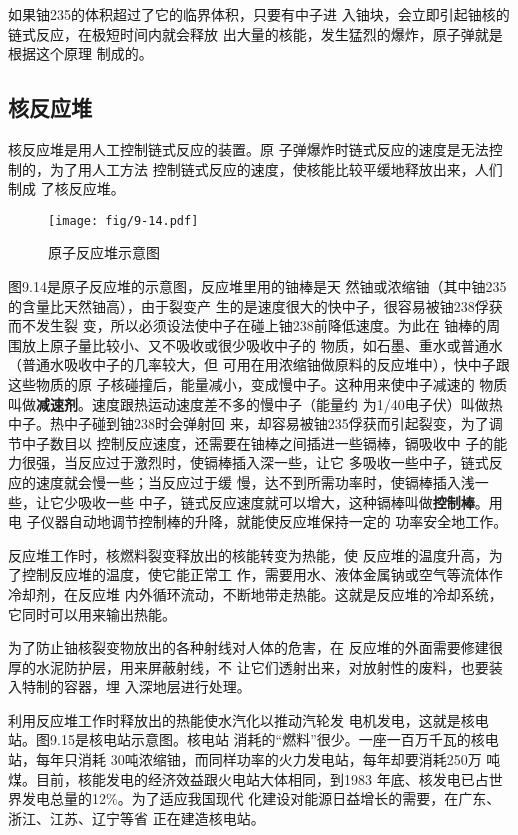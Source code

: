 如果铀235的体积超过了它的临界体积，只要有中子进
入铀块，会立即引起铀核的链式反应，在极短时间内就会释放
出大量的核能，发生猛烈的爆炸，原子弹就是根据这个原理
制成的。

\subsection{核反应堆}

核反应堆是用人工控制链式反应的装置。原
子弹爆炸时链式反应的速度是无法控制的，为了用人工方法
控制链式反应的速度，使核能比较平缓地释放出来，人们制成
了核反应堆。
\begin{figure}[htp]
    \centering
    \texttt{[image: fig/9-14.pdf]}
    \caption{原子反应堆示意图}
\end{figure}

图9.14是原子反应堆的示意图，反应堆里用的铀棒是天
然铀或浓缩铀（其中铀235的含量比天然铀高），由于裂变产
生的是速度很大的快中子，很容易被铀238俘获而不发生裂
变，所以必须设法使中子在碰上铀238前降低速度。为此在
铀棒的周围放上原子量比较小、又不吸收或很少吸收中子的
物质，如石墨、重水或普通水（普通水吸收中子的几率较大，但
可用在用浓缩铀做原料的反应堆中），快中子跟这些物质的原
子核碰撞后，能量减小，变成慢中子。这种用来使中子减速的
物质叫做\textbf{减速剂}。速度跟热运动速度差不多的慢中子（能量约
为1/40电子伏）叫做热中子。热中子碰到铀238时会弹射回
来，却容易被铀235俘获而引起裂变，为了调节中子数目以
控制反应速度，还需要在铀棒之间插进一些镉棒，镉吸收中
子的能力很强，当反应过于激烈时，使镉棒插入深一些，让它
多吸收一些中子，链式反应的速度就会慢一些；当反应过于缓
慢，达不到所需功率时，使镉棒插入浅一些，让它少吸收一些
中子，链式反应速度就可以增大，这种镉棒叫做\textbf{控制棒}。用电
子仪器自动地调节控制棒的升降，就能使反应堆保持一定的
功率安全地工作。

反应堆工作时，核燃料裂变释放出的核能转变为热能，使
反应堆的温度升高，为了控制反应堆的温度，使它能正常工
作，需要用水、液体金属钠或空气等流体作冷却剂，在反应堆
内外循环流动，不断地带走热能。这就是反应堆的冷却系统，
它同时可以用来输出热能。

为了防止铀核裂变物放出的各种射线对人体的危害，在
反应堆的外面需要修建很厚的水泥防护层，用来屏蔽射线，不
让它们透射出来，对放射性的废料，也要装入特制的容器，埋
入深地层进行处理。

利用反应堆工作时释放出的热能使水汽化以推动汽轮发
电机发电，这就是核电站。图9.15是核电站示意图。核电站
消耗的“燃料”很少。一座一百万千瓦的核电站，每年只消耗
30吨浓缩铀，而同样功率的火力发电站，每年却要消耗250万
吨煤。目前，核能发电的经济效益跟火电站大体相同，到1983
年底、核发电已占世界发电总量的12\%。为了适应我国现代
化建设对能源日益增长的需要，在广东、浙江、江苏、辽宁等省
正在建造核电站。

